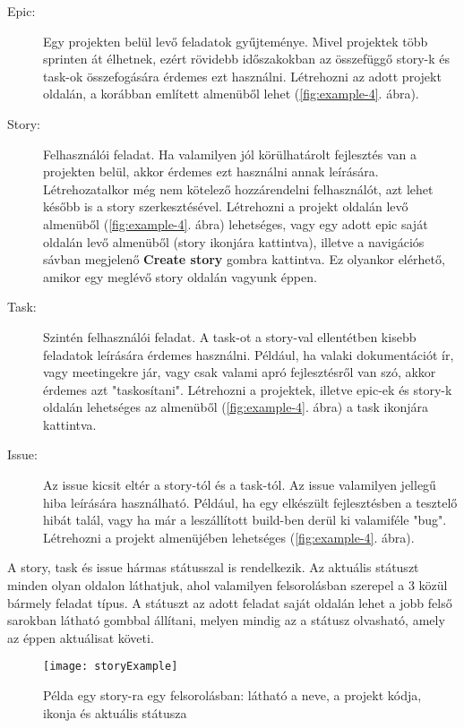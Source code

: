 \begin{description}
	\item[Epic:] Egy projekten belül levő feladatok gyűjteménye. Mivel projektek több sprinten át élhetnek, ezért rövidebb időszakokban az összefüggő story-k és task-ok összefogására érdemes ezt használni. Létrehozni az adott projekt oldalán, a korábban említett almenüből lehet (\ref{fig:example-4}. ábra). 
	\item[Story:] Felhasználói feladat. Ha valamilyen jól körülhatárolt fejlesztés van a projekten belül, akkor érdemes ezt használni annak leírására. Létrehozatalkor még nem kötelező hozzárendelni felhasználót, azt lehet később is a story szerkesztésével. Létrehozni a projekt oldalán levő almenüből (\ref{fig:example-4}. ábra) lehetséges, vagy egy adott epic saját oldalán levő almenüből (story ikonjára kattintva), illetve a navigációs sávban megjelenő \textbf{Create story} gombra kattintva. Ez olyankor elérhető, amikor egy meglévő story oldalán vagyunk éppen.
	\item[Task:] Szintén felhasználói feladat. A task-ot a story-val ellentétben kisebb feladatok leírására érdemes használni. Például, ha valaki dokumentációt ír, vagy meetingekre jár, vagy csak valami apró fejlesztésről van szó, akkor érdemes azt "taskosítani". Létrehozni a projektek, illetve epic-ek és story-k oldalán lehetséges az almenüből (\ref{fig:example-4}. ábra) a task ikonjára kattintva.
	\item[Issue:] Az issue kicsit eltér a story-tól és a task-tól. Az issue valamilyen jellegű hiba leírására használható. Például, ha egy elkészült fejlesztésben a tesztelő hibát talál, vagy ha már a leszállított build-ben derül ki valamiféle "bug". Létrehozni a projekt almenüjében lehetséges (\ref{fig:example-4}. ábra).
\end{description}

A story, task és issue hármas státusszal is rendelkezik. Az aktuális státuszt minden olyan oldalon láthatjuk, ahol valamilyen felsorolásban szerepel a 3 közül bármely feladat típus. A státuszt az adott feladat saját oldalán lehet a jobb felső sarokban látható gombbal állítani, melyen mindig az a státusz olvasható, amely az éppen aktuálisat követi.

\begin{figure}[H]
	\centering
	\texttt{[image: storyExample]}
	\caption{Példa egy story-ra egy felsorolásban: látható a neve, a projekt kódja, ikonja és aktuális státusza}
	\label{fig:example-6}
\end{figure}


